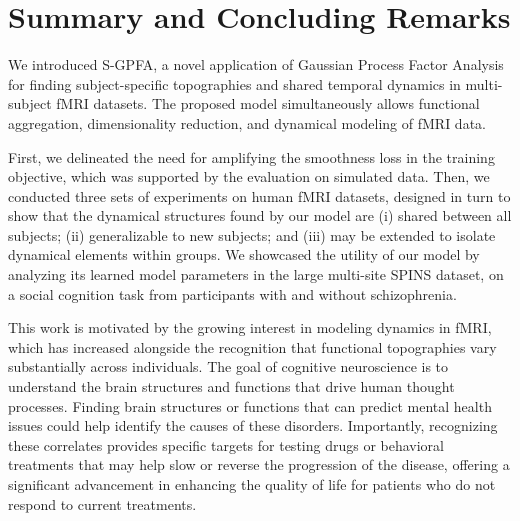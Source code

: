 \section{Summary and Concluding Remarks}
\label{ch1:sec:conclusion}

We introduced S-GPFA, a novel application of Gaussian Process Factor Analysis for finding subject-specific topographies and shared temporal dynamics in multi-subject fMRI datasets. The proposed model simultaneously allows functional aggregation, dimensionality reduction, and dynamical modeling of fMRI data. 

First, we delineated the need for amplifying the smoothness loss in the training objective, which was supported by the evaluation on simulated data. Then, we conducted three sets of experiments on human fMRI datasets, designed in turn to show that the dynamical structures found by our model are (i) shared between all subjects; (ii) generalizable to new subjects; and (iii) may be extended to isolate dynamical elements within groups. We showcased the utility of our model by analyzing its learned model parameters in the large multi-site SPINS dataset, on a social cognition task from participants with and without schizophrenia.

This work is motivated by the growing interest in modeling dynamics in fMRI, which has increased alongside the recognition that functional topographies vary substantially across individuals. The goal of cognitive neuroscience is to understand the brain structures and functions that drive human thought processes. Finding brain structures or functions that can predict mental health issues could help identify the causes of these disorders. Importantly, recognizing these correlates provides specific targets for testing drugs or behavioral treatments that may help slow or reverse the progression of the disease, offering a significant advancement in enhancing the quality of life for patients who do not respond to current treatments.



